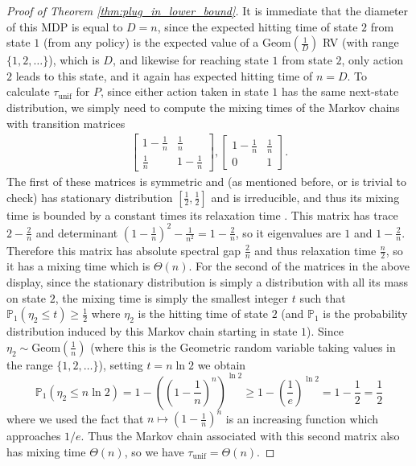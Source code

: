 \documentclass{article}
\theoremstyle{plain}
\theoremstyle{plain}
\theoremstyle{remark}
\theoremstyle{plain}
\theoremstyle{plain}
\renewcommand{\P}{\mathbb{P}}
\newcommand{\tmix}{\tau_{\mathrm{unif}}}
\begin{document}
\begin{proof}[Proof of Theorem \ref{thm:plug_in_lower_bound}]
It is immediate that the diameter of this MDP is equal to $D = n$, since the expected hitting time of state $2$ from state $1$ (from any policy) is the expected value of a $\text{Geom}(\frac{1}{D})$ RV (with range $\{1, 2, \dots\}$), which is $D$, and likewise for reaching state $1$ from state $2$, only action $2$ leads to this state, and it again has expected hitting time of $n = D$. To calculate $\tmix$ for $P$, since either action taken in state $1$ has the same next-state distribution, we simply need to compute the mixing times of the Markov chains with transition matrices
\begin{align*}
    \begin{bmatrix}
        1-\frac{1}{n} & \frac{1}{n} \\
        \frac{1}{n} & 1 - \frac{1}{n}
    \end{bmatrix},
    \begin{bmatrix}
        1-\frac{1}{n} & \frac{1}{n} \\
        0 & 1
    \end{bmatrix}.
\end{align*}
The first of these matrices is symmetric and (as mentioned before, or is trivial to check) has stationary distribution $[\frac{1}{2}, \frac{1}{2}]$ and is irreducible, and thus its mixing time is bounded by a constant times its relaxation time \citep[Theorem 12.4]{levin_markov_2017}. This matrix has trace $2 - \frac{2}{n}$ and determinant $(1-\frac{1}{n})^2 - \frac{1}{n^2} = 1 - \frac{2}{n}$, so it eigenvalues are $1$ and $1-\frac{2}{n}$. Therefore this matrix has absolute spectral gap $\frac{2}{n}$ and thus relaxation time $\frac{n}{2}$, so it has a mixing time which is $\Theta(n)$. For the second of the matrices in the above display, since the stationary distribution is simply a distribution with all its mass on state $2$, the mixing time is simply the smallest integer $t$ such that $\P_1(\eta_2 \leq t) \geq \frac{1}{2}$ where $\eta_2$ is the hitting time of state $2$ (and $\P_1$ is the probability distribution induced by this Markov chain starting in state $1$). Since $\eta_2 \sim \text{Geom}(\frac{1}{n})$ (where this is the Geometric random variable taking values in the range $\{1,2,\dots\}$), setting $t = n \ln 2 $ we obtain
\[
\P_1(\eta_2 \leq n \ln 2) = 1 - \left(\left(1 -\frac{1}{n} \right)^{n}\right)^{\ln 2} \geq 1 - \left(\frac{1}{e}\right)^{\ln 2} = 1 - \frac{1}{2} = \frac{1}{2}
\]
where we used the fact that $n \mapsto (1-\frac{1}{n})^n$ is an increasing function which approaches $1/e$. Thus the Markov chain associated with this second matrix also has mixing time $\Theta(n)$, so we have $\tmix = \Theta(n)$.


\end{proof}
\end{document}
